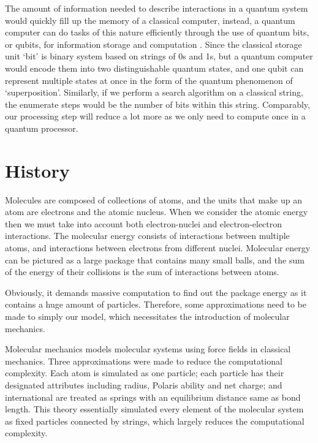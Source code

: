 \documentclass[12pt]{article}
\begin{document}
The amount of information needed to describe interactions in a quantum system would quickly fill up the memory of a classical computer, instead,
a quantum computer can do tasks of this nature efficiently through the use of quantum bits, or qubits, for information storage and computation
\cite{trabesinger2012quantum}. Since the classical storage unit ‘bit’ is binary system based on strings of 0s and 1s, but a quantum computer would
encode them into two distinguishable quantum states, and one qubit can represent multiple states at once in the form of the quantum phenomenon of
‘superposition’. Similarly, if we perform a search algorithm on a classical string, the enumerate steps would be the number of bits within this
string. Comparably, our processing step will reduce a lot more as we only need to compute once in a quantum processor.

\section{History}
Molecules are composed of collections of atoms, and the units that make up an atom are electrons and the atomic nucleus. When we consider the
 atomic energy then we must take into account both electron-nuclei and electron-electron interactions. The molecular energy consists of interactions
 between multiple atoms, and interactions between electrons from different nuclei. Molecular energy can be pictured as a large
 package that contains many small balls, and the sum of the energy of their collisions is the sum of interactions between atoms.

Obviously, it demands massive computation to find out the package energy as it contains a huge amount of particles. Therefore, some approximations
 need to be made to simply our model, which necessitates the introduction of molecular mechanics.

Molecular mechanics models molecular systems using force fields in classical mechanics. Three approximations were made to reduce the computational
 complexity. Each atom is simulated as one particle; each particle has their designated attributes including radius, Polaris ability and net charge;
 and international are treated as springs with an equilibrium distance same as bond length. This theory essentially simulated every element of the
 molecular system as fixed particles connected by strings, which largely reduces the computational complexity.
\end{document}
